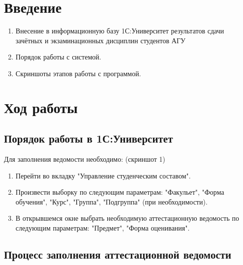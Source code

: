 \documentclass[12pt,a4paper]{article}
\begin{document}
\section{Введение}
\label{sec:intro}

\begin{enumerate}
 \item Внесение в информационную базу 1С:Университет результатов сдачи зачётных и экзаминационных дисциплин студентов АГУ
 \item Порядок работы с системой.
 \item Скриншоты этапов работы с программой.
\end{enumerate}

\newpage
\section{Ход работы}
\label{sec:exp}

\subsection{Порядок работы в 1С:Университет}
\label{sec:exp:code}
Для заполнения ведомости необходимо: (скриншот 1)
\begin{enumerate}
			\item Перейти во вкладку "Управление студенческим составом".
            \item Произвести выборку по следующим параметрам: "Факульет", "Форма обучения", "Курс", "Группа", "Подгруппа" (при необходимости).
            \item В открывшемся окне выбрать необходимую аттестационную ведомость по следующим параметрам: "Предмет", "Форма оценивания".
\end{enumerate}

\subsection{Процесс заполнения аттестационной ведомости}
\label{sec:mathexample}
\end{document}
